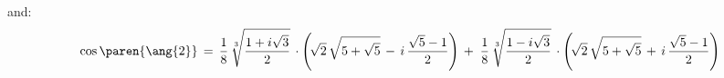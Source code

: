 and:
\begin{equation*}
 \cos\paren{\ang{2}}
 \, = \, \frac{1}{8} \, \sqrt[3]{\frac{1 + i \sqrt{3}}{2}}
   \, \cdot
   \Bigg( \!
     \sqrt{2} \, \sqrt{5 + \sqrt{5}}
     \, - \, i \, \frac{\sqrt{5} - 1}{2}
   \Bigg)
 \, + \;
   \frac{1}{8} \, \sqrt[3]{\frac{1 - i \sqrt{3}}{2}}
   \, \cdot
   \Bigg( \!
     \sqrt{2} \, \sqrt{5 + \sqrt{5}}
     \, + \, i \, \frac{\sqrt{5} - 1}{2}
   \Bigg)
\end{equation*}
